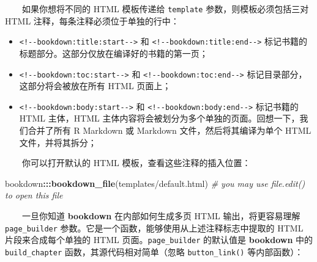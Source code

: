 \documentclass[
  12pt,
]{krantz}
\newenvironment{Shaded}{\begin{snugshade}}{\end{snugshade}}
\newcommand{\CommentTok}[1]{\textcolor[rgb]{0.56,0.35,0.01}{\textit{#1}}}
\newcommand{\FunctionTok}[1]{\textcolor[rgb]{0.13,0.29,0.53}{\textbf{#1}}}
\newcommand{\NormalTok}[1]{#1}
\newcommand{\SpecialCharTok}[1]{\textcolor[rgb]{0.81,0.36,0.00}{\textbf{#1}}}
\newcommand{\StringTok}[1]{\textcolor[rgb]{0.31,0.60,0.02}{#1}}
\providecommand{\tightlist}{%
  \setlength{\itemsep}{0pt}\setlength{\parskip}{0pt}}
\theoremstyle{definition}
\theoremstyle{definition}
\theoremstyle{definition}
\theoremstyle{definition}
\theoremstyle{remark}
\begin{document}
  如果你想将不同的 HTML 模板传递给 \texttt{template} 参数，则模板必须包括三对 HTML 注释，每条注释必须位于单独的行中：

\begin{itemize}
\tightlist
\item
  \texttt{\textless{}!-\/-bookdown:title:start-\/-\textgreater{}} 和 \texttt{\textless{}!-\/-bookdown:title:end-\/-\textgreater{}} 标记书籍的标题部分。这部分仅放在编译好的书籍的第一页；
\item
  \texttt{\textless{}!-\/-bookdown:toc:start-\/-\textgreater{}} 和 \texttt{\textless{}!-\/-bookdown:toc:end-\/-\textgreater{}} 标记目录部分，这部分将会被放在所有 HTML 页面上；
\item
  \texttt{\textless{}!-\/-bookdown:body:start-\/-\textgreater{}} 和 \texttt{\textless{}!-\/-bookdown:body:end-\/-\textgreater{}} 标记书籍的 HTML 主体，HTML 主体内容将会被划分为多个单独的页面。回想一下，我们合并了所有 R Markdown 或 Markdown 文件，然后将其编译为单个 HTML 文件，并将其拆分；
\end{itemize}

  你可以打开默认的 HTML 模板，查看这些注释的插入位置：

\begin{Shaded}
\begin{Highlighting}[]
\NormalTok{bookdown}\SpecialCharTok{:::}\FunctionTok{bookdown\_file}\NormalTok{(}\StringTok{\textquotesingle{}templates/default.html\textquotesingle{}}\NormalTok{)}
\CommentTok{\# you may use file.edit() to open this file}
\end{Highlighting}
\end{Shaded}

  一旦你知道 \textbf{bookdown} 在内部如何生成多页 HTML 输出，将更容易理解 \texttt{page\_builder} 参数。它是一个函数，能够使用从上述注释标志中提取的 HTML 片段来合成每个单独的 HTML 页面。\texttt{page\_builder} 的默认值是 \textbf{bookdown} 中的 \texttt{build\_chapter} 函数，其源代码相对简单（忽略 \texttt{button\_link()} 等内部函数）：
\end{document}

